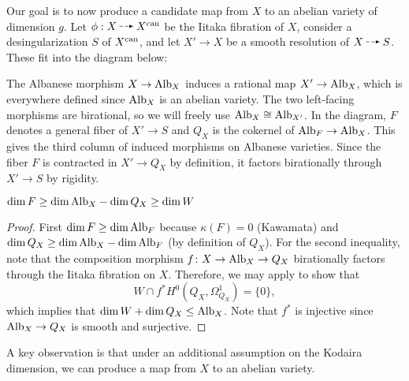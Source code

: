 \documentclass[12pt]{article}
\begin{document}
Our goal is to now produce a candidate map from $X$ to an abelian variety of dimension $g$. Let $\phi : X \rat X^{\can}$ be the Iitaka fibration of $X$, consider a desingularization $S$ of $X^{\mathrm{can}}$, and let $X' \to X$ be a smooth resolution of $X \rat S$. These fit into the diagram below:
\begin{center}
\end{center}
The Albanese morphism $X \to \mathrm{Alb}_{X}$ induces a rational map $X' \to \mathrm{Alb}_X$, which is everywhere defined since $\mathrm{Alb}_X$ is an abelian variety. The two left-facing morphisms are birational, so we will freely use $\mathrm{Alb}_{X} \cong \mathrm{Alb}_{X'}$. In the diagram, $F$ denotes a general fiber of $X' \rightarrow S$ and $Q_X$ is the cokernel of $\mathrm{Alb}_F \to \mathrm{Alb}_X$. This gives the third column of induced morphisms on Albanese varieties. Since the fiber $F$ is contracted in $X' \to Q_X$ by definition, it factors birationally through $X' \to S$ by rigidity. 


\begin{lemma}
    $\dim{F} \ge \dim{\mathrm{Alb}_X} - \dim{Q_X} \ge \dim{W}$
\end{lemma}

\begin{proof}
First $\dim{F} \ge \dim{\mathrm{Alb}_F}$ because $\kappa(F) = 0$ (Kawamata) and $\dim{Q_X} \ge \dim{\mathrm{Alb}_X} - \dim{\mathrm{Alb}_F}$ (by definition of $Q_X$). For the second inequality, note that the composition morphism $f \colon X \to \mathrm{Alb}_{X} \to Q_X$ birationally factors through the Iitaka fibration on $X$. Therefore, we may apply \cite[Theorem 2.1]{PS14} to show that
\[ W \cap f^{*} H^{0}(Q_X, \Omega_{Q_X}^1) = \{ 0 \}, \]
which implies that $\dim W + \dim Q_X \leq \mathrm{Alb}_{X}$. Note that $f^{\ast}$ is injective since $\mathrm{Alb}_X \to Q_X$ is smooth and surjective.
\end{proof}

A key observation is that under an additional assumption on the Kodaira dimension, we can produce a map from $X$ to an abelian variety.
\end{document}
